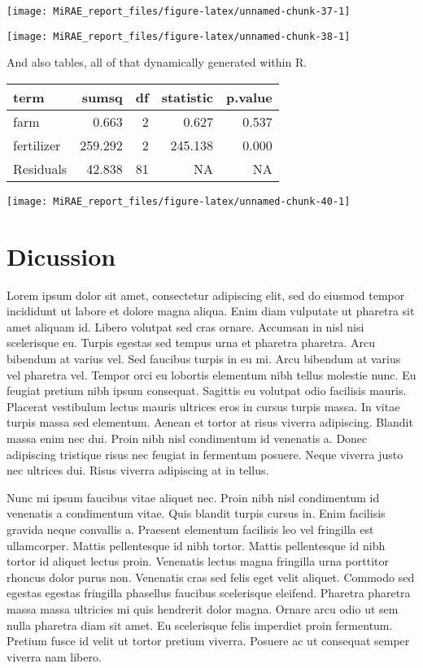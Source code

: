 \documentclass[
]{article}
\begin{document}
\begin{center}\texttt{[image: MiRAE\_report\_files/figure-latex/unnamed-chunk-37-1]} \end{center}

\begin{center}\texttt{[image: MiRAE\_report\_files/figure-latex/unnamed-chunk-38-1]} \end{center}
\newpage

And also tables, all of that dynamically generated within R.

\begin{longtable}[]{@{}lrrrr@{}}
\toprule
term & sumsq & df & statistic & p.value\tabularnewline
\midrule
\endhead
farm & 0.663 & 2 & 0.627 & 0.537\tabularnewline
fertilizer & 259.292 & 2 & 245.138 & 0.000\tabularnewline
Residuals & 42.838 & 81 & NA & NA\tabularnewline
\bottomrule
\end{longtable}

\begin{center}\texttt{[image: MiRAE\_report\_files/figure-latex/unnamed-chunk-40-1]} \end{center}

\hypertarget{dicussion}{%
\section{Dicussion}\label{dicussion}}

Lorem ipsum dolor sit amet, consectetur adipiscing elit, sed do eiusmod
tempor incididunt ut labore et dolore magna aliqua. Enim diam vulputate
ut pharetra sit amet aliquam id. Libero volutpat sed cras ornare.
Accumsan in nisl nisi scelerisque eu. Turpis egestas sed tempus urna et
pharetra pharetra. Arcu bibendum at varius vel. Sed faucibus turpis in
eu mi. Arcu bibendum at varius vel pharetra vel. Tempor orci eu lobortis
elementum nibh tellus molestie nunc. Eu feugiat pretium nibh ipsum
consequat. Sagittis eu volutpat odio facilisis mauris. Placerat
vestibulum lectus mauris ultrices eros in cursus turpis massa. In vitae
turpis massa sed elementum. Aenean et tortor at risus viverra
adipiscing. Blandit massa enim nec dui. Proin nibh nisl condimentum id
venenatis a. Donec adipiscing tristique risus nec feugiat in fermentum
posuere. Neque viverra justo nec ultrices dui. Risus viverra adipiscing
at in tellus.

Nunc mi ipsum faucibus vitae aliquet nec. Proin nibh nisl condimentum id
venenatis a condimentum vitae. Quis blandit turpis cursus in. Enim
facilisis gravida neque convallis a. Praesent elementum facilisis leo
vel fringilla est ullamcorper. Mattis pellentesque id nibh tortor.
Mattis pellentesque id nibh tortor id aliquet lectus proin. Venenatis
lectus magna fringilla urna porttitor rhoncus dolor purus non. Venenatis
cras sed felis eget velit aliquet. Commodo sed egestas egestas fringilla
phasellus faucibus scelerisque eleifend. Pharetra pharetra massa massa
ultricies mi quis hendrerit dolor magna. Ornare arcu odio ut sem nulla
pharetra diam sit amet. Eu scelerisque felis imperdiet proin fermentum.
Pretium fusce id velit ut tortor pretium viverra. Posuere ac ut
consequat semper viverra nam libero.
\end{document}
